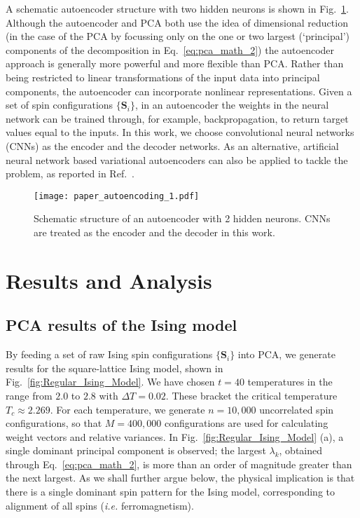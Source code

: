 \documentclass[pra,letterpaper,10pt,twocolumn]{revtex4}
\begin{document}
A schematic autoencoder structure with two hidden neurons is shown in
Fig.~\ref{fig:autoencoding_1}. Although the autoencoder and PCA both use
the idea of dimensional reduction (in the case of the PCA by focussing
only on the one or two largest (`principal') components of the
decomposition in Eq.~\ref{eq:pca_math_2}) the autoencoder approach is
generally more powerful and more flexible than PCA.  Rather than being
restricted to linear transformations of the input data into principal
components, the autoencoder can incorporate nonlinear representations.
Given a set of spin configurations $\{\mathbf{S}_i\}$, in an autoencoder
the weights in the neural network can be trained through, for example,
backpropagation\cite{Witten, Rumelhart}, to return target values equal
to the inputs. In this work, we choose convolutional neural networks
(CNNs)\cite{Krizhevsky, Lawrence, Schmidhuber} as the encoder and the
decoder networks. As an alternative, artificial neural network based variational autoencoders can also be applied to tackle the problem, as reported in Ref.~\cite{Wetzel}.
 
\begin{figure}[!h]
\texttt{[image: paper\_autoencoding\_1.pdf]}
\caption{ Schematic structure of an autoencoder with 2 hidden neurons.
CNNs are treated as the encoder and the decoder in this work.
\label{fig:autoencoding_1} } \end{figure}


\section{Results and Analysis}


\subsection{PCA results of the Ising model}


By feeding a set of raw Ising spin configurations $\{\mathbf{S}_i\}$
into PCA, we generate results for the square-lattice Ising model, shown in
Fig.~\ref{fig:Regular_Ising_Model}.  
We have chosen $t=40$
temperatures in the range from $2.0$ to $2.8$ with $\Delta T = 0.02$.
These bracket the critical temperature $T_c\approx 2.269$.
For each temperature, we generate $n=10,000$ uncorrelated spin
configurations, so that $M=400,000$ configurations are used for
calculating weight vectors and relative variances. 
In Fig.~\ref{fig:Regular_Ising_Model} (a), a single dominant
principal component is observed;  
the largest $\lambda_k$, obtained through
Eq.~\ref{eq:pca_math_2},
is more than an order of magnitude greater than the next largest.
As we shall further argue below, the physical implication is that
there is a single
dominant spin pattern for the Ising model, corresponding to alignment
of all spins ({\it i.e.} ferromagnetism). 
\end{document}
